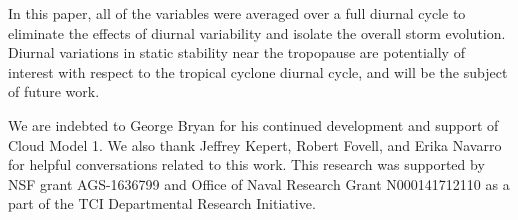 \documentclass{ametsoc}
\begin{document}
In this paper, all of the variables were averaged over a full diurnal cycle to eliminate the effects of diurnal variability and isolate the overall storm evolution.
Diurnal variations in static stability near the tropopause are potentially of interest with respect to the tropical cyclone diurnal cycle, and will be the subject of future work.








%
\acknowledgments
We are indebted to George Bryan for his continued development and support of Cloud Model 1.
We also thank Jeffrey Kepert, Robert Fovell, and Erika Navarro for helpful conversations related to this work.
This research was supported by NSF grant AGS-1636799 and Office of Naval Research Grant N000141712110 as a part of the TCI Departmental Research Initiative.
\end{document}
